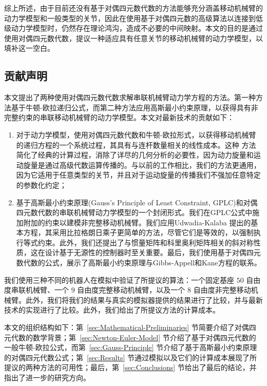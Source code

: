 综上所述，由于目前还没有基于对偶四元数代数的方法能够充分涵盖移动机械臂的动力学模型和一般类型的关节，因此在使用基于对偶四元数的高级算法以连接到低级动力学模型时，仍然存在理论鸿沟，造成不必要的中间映射。本文的目的是通过使用对偶四元数代数，提议一种适应具有任意关节的移动机械臂的动力学模型，以填补这一空白。

\subsection{\normalfont\bfseries 贡献声明}

本文提出了两种使用对偶四元数代数求解串联机械臂动力学方程的方法。第一种方法基于牛顿-欧拉递归公式，而第二种方法应用高斯最小约束原理，以获得具有非完整约束的串联移动机械臂的动力学模型。本文对最新技术的贡献如下：
\begin{enumerate}
\item 对于动力学模型，使用对偶四元数代数和牛顿-欧拉形式，以获得移动机械臂的递归方程的一个系统过程，其具有与连杆数量相关的线性成本。这种
方法简化了经典的计算过程，消除了详尽的几何分析的必要性，因为动力旋量和运动旋量是通过高级代数运算传播的。与以前的工作相比，我们的方法更通用，因为它适用于任意类型的关节，并且对于运动旋量的传播我们不强加任意特定的参数化约定；
\item 基于高斯最小约束原理(Gauss's Principle of Least Constraint, GPLC)和对偶四元数代数的串联机械臂动力学模型的一个封闭形式。我们在GPLC公式中施加附加的约束以建模非完整移动机械臂。我们应用Udwadia-Kalaba \cite{FirdausE.UdwadiaandRobertE.Kalaba1992}提出的基本方程，其采用比拉格朗日乘子更简单的方法，尽管它们是等效的，以强制执行等式约束。此外，我们还提出了与惯量矩阵和科里奥利矩阵相关的斜对称性质，这在设计基于无源性的控制器时至关重要。最后，我们使用基于对偶四元数代数的公式，展示了高斯最小约束原理与Gibbs-Appell和Kane方程的联系。
\end{enumerate}
%
我们使用三种不同的机器人在模拟中验证了所提议的算法：一个固定基座 $50$ 自由度串联机械臂、一个 $9$ 自由度完整移动机械臂，以及一个 $8$ 自由度非完整移动机械臂。此外，我们将我们的结果与真实的模拟器提供的结果进行了比较，并与最新技术的实现进行了比较。此外，我们给出了所提议方法的计算成本。

本文的组织结构如下：第~\ref{sec:Mathematical-Preliminaries} 节简要介绍了对偶四元代数的数学背景；第~\ref{sec:Newton-Euler-Model} 节介绍了基于对偶四元代数的一般牛顿-欧拉公式，而第~\ref{sec:Gauss-Principle} 节介绍了基于高斯最小约束原理的对偶四元代数公式；第~\ref{sec:Results} 节通过模拟以及它们的计算成本展现了所提议的两种方法的可用性；最后，第~\ref{sec:Conclusions} 节给出了最后的结论，并指出了进一步的研究方向。
